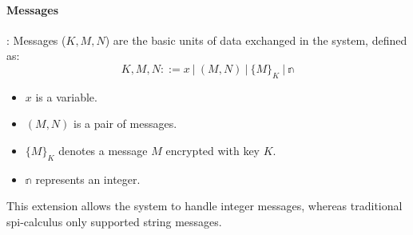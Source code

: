 \documentclass[master,english]{kuisthesis}
\theoremstyle{definition}
\begin{document}
\paragraph{Messages}:
Messages (\(K, M, N\)) are the basic units of data exchanged in the system, defined as:
\[
K, M, N ::= x ~|~ (M, N) ~|~ \{M\}_K ~|~ \mathbb{n}
\]
\begin{itemize}
    \item \(x\) is a variable.
    \item \((M, N)\) is a pair of messages.
    \item \(\{M\}_K\) denotes a message \(M\) encrypted with key \(K\).
    \item \(\mathbb{n}\) represents an integer.
\end{itemize}
This extension allows the system to handle integer messages, whereas traditional spi-calculus only supported string messages.
\end{document}

